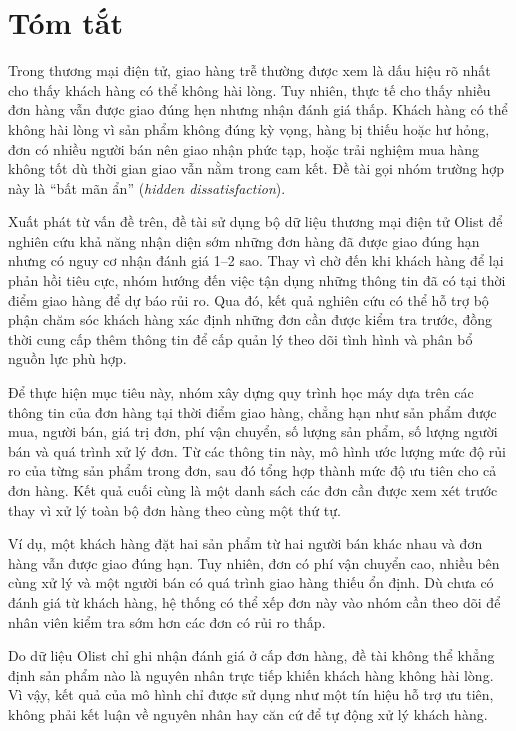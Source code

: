 \documentclass[12pt,a4paper]{report}
\begin{document}
 \chapter*{Tóm tắt}

Trong thương mại điện tử, giao hàng trễ thường được xem là dấu hiệu rõ nhất cho thấy khách hàng có thể không hài lòng. Tuy nhiên, thực tế cho thấy nhiều đơn hàng vẫn được giao đúng hẹn nhưng nhận đánh giá thấp. Khách hàng có thể không hài lòng vì sản phẩm không đúng kỳ vọng, hàng bị thiếu hoặc hư hỏng, đơn có nhiều người bán nên giao nhận phức tạp, hoặc trải nghiệm mua hàng không tốt dù thời gian giao vẫn nằm trong cam kết. Đề tài gọi nhóm trường hợp này là ``bất mãn ẩn'' (\emph{hidden dissatisfaction}).

Xuất phát từ vấn đề trên, đề tài sử dụng bộ dữ liệu thương mại điện tử Olist để nghiên cứu khả năng nhận diện sớm những đơn hàng đã được giao đúng hạn nhưng có nguy cơ nhận đánh giá 1–2 sao. Thay vì chờ đến khi khách hàng để lại phản hồi tiêu cực, nhóm hướng đến việc tận dụng những thông tin đã có tại thời điểm giao hàng để dự báo rủi ro. Qua đó, kết quả nghiên cứu có thể hỗ trợ bộ phận chăm sóc khách hàng xác định những đơn cần được kiểm tra trước, đồng thời cung cấp thêm thông tin để cấp quản lý theo dõi tình hình và phân bổ nguồn lực phù hợp.

Để thực hiện mục tiêu này, nhóm xây dựng quy trình học máy dựa trên các thông tin của đơn hàng tại thời điểm giao hàng, chẳng hạn như sản phẩm được mua, người bán, giá trị đơn, phí vận chuyển, số lượng sản phẩm, số lượng người bán và quá trình xử lý đơn. Từ các thông tin này, mô hình ước lượng mức độ rủi ro của từng sản phẩm trong đơn, sau đó tổng hợp thành mức độ ưu tiên cho cả đơn hàng. Kết quả cuối cùng là một danh sách các đơn cần được xem xét trước thay vì xử lý toàn bộ đơn hàng theo cùng một thứ tự.

Ví dụ, một khách hàng đặt hai sản phẩm từ hai người bán khác nhau và đơn hàng vẫn được giao đúng hạn. Tuy nhiên, đơn có phí vận chuyển cao, nhiều bên cùng xử lý và một người bán có quá trình giao hàng thiếu ổn định. Dù chưa có đánh giá từ khách hàng, hệ thống có thể xếp đơn này vào nhóm cần theo dõi để nhân viên kiểm tra sớm hơn các đơn có rủi ro thấp.

Do dữ liệu Olist chỉ ghi nhận đánh giá ở cấp đơn hàng, đề tài không thể khẳng định sản phẩm nào là nguyên nhân trực tiếp khiến khách hàng không hài lòng. Vì vậy, kết quả của mô hình chỉ được sử dụng như một tín hiệu hỗ trợ ưu tiên, không phải kết luận về nguyên nhân hay căn cứ để tự động xử lý khách hàng.
\end{document}
